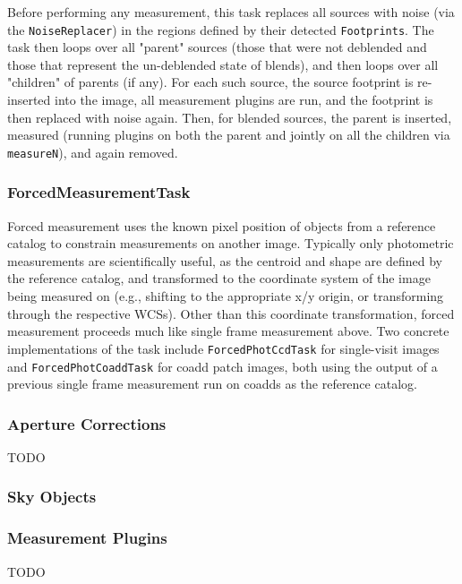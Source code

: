 Before performing any measurement, this task replaces all sources with noise (via the \texttt{NoiseReplacer}) in the regions defined by their detected \texttt{Footprints}.
The task then loops over all "parent" sources (those that were not deblended and those that represent the un-deblended state of blends), and then loops over all "children" of parents (if any).
For each such source, the source footprint is re-inserted into the image, all measurement plugins are run, and the footprint is then replaced with noise again.
Then, for blended sources, the parent is inserted, measured (running plugins on both the parent and jointly on all the children via \texttt{measureN}), and again removed.

\subsubsection{ForcedMeasurementTask}
\label{sec:ForcedMeasurementTask}

Forced measurement uses the known pixel position of objects from a reference catalog to constrain measurements on another image.
Typically only photometric measurements are scientifically useful, as the centroid and shape are defined by the reference catalog, and transformed to the coordinate system of the image being measured on (e.g., shifting to the appropriate x/y origin, or transforming through the respective WCSs).
Other than this coordinate transformation, forced measurement proceeds much like single frame measurement above.
Two concrete implementations of the task include \texttt{ForcedPhotCcdTask} for single-visit images and \texttt{ForcedPhotCoaddTask} for coadd patch images, both using the output of a previous single frame measurement run on coadds as the reference catalog.

\subsubsection{Aperture Corrections}
\label{sec:apcorr}

TODO

\subsubsection{Sky Objects}

\label{sec:sky-objects}

\subsubsection{Measurement Plugins}


TODO










